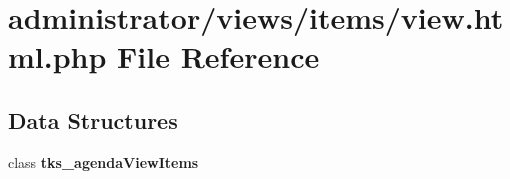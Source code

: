 \section{administrator/views/items/view.html.\+php File Reference}
\label{administrator_2views_2items_2view_8html_8php}
\subsection*{Data Structures}
\begin{DoxyCompactItemize}
\item 
class \textbf{ tks\+\_\+agenda\+View\+Items}
\end{DoxyCompactItemize}
